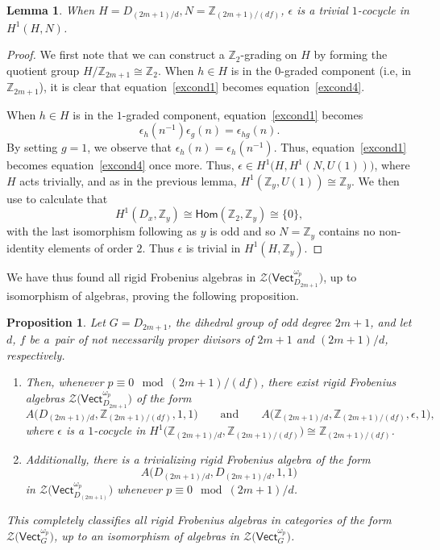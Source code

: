 \documentclass[10pt,a4paper]{amsart}
\numberwithin{equation}{section}
\newtheorem{Lemma}[Theorem]{Lemma}
\newtheorem{Proposition}[Theorem]{Proposition}
 { \theoremstyle{definition}
\newtheorem{Definition}[Theorem]{Definition}
\newtheorem{Note}[Theorem]{Note}
\newtheorem{Notation}[Theorem]{Notation}
\newtheorem{Example}[Theorem]{Example}
\newtheorem{Remark}[Theorem]{Remark} }
\newcommand{\Hom}{\mathsf{Hom}}
\newcommand{\Vect}{\mathsf{Vect}}
\newcommand{\mZ}{\mathbb{Z}}
\newcommand{\cZ}{\mathcal{Z}}
\begin{document}
\begin{Lemma}
 When $H=D_{(2m+1)/d},N=\mZ_{(2m+1)/(df)}$, $\epsilon$ is a trivial $1$-cocycle in $H^1(H,N)$.
\end{Lemma}
\begin{proof}
We first note that we can construct a $\mZ_2$-grading on $H$ by forming the quotient group $H/\mZ_{2m+1}\cong \mZ_2$. When $h\in H$ is in the $0$-graded component (i.e, in $\mZ_{2m+1}$), it is clear that equation~\eqref{excond1} becomes equation~\eqref{excond4}.

When $h \in H$ is in the $1$-graded component, equation~\eqref{excond1} becomes \[\epsilon_h(n^{-1})\epsilon_g(n) = \epsilon_{hg}(n).\]
By setting $g=1$, we observe that $\epsilon_h(n)=\epsilon_h(n^{-1})$. Thus, equation~\eqref{excond1} becomes equation~\eqref{excond4} once more. Thus, $\epsilon \in H^1\big(H,H^1(N,U(1))\big)$, where $H$ acts trivially, and as in the previous lemma, $H^1(\mZ_y,U(1)) \cong \mZ_y$. We then use \cite[Theorem~3.6.5, Corollary~3.3.11, Example~6.8.5]{Wei} to calculate that
\[H^1(D_x,\mZ_y)\cong \Hom(\mZ_2,\mZ_y) \cong \lbrace 0 \rbrace,\]
with the last isomorphism following as $y$ is odd and so $N=\mZ_y$ contains no non-identity elements of order $2$. Thus $\epsilon$ is trivial in $H^1(H,\mZ_y)$.
\end{proof}

We have thus found all rigid Frobenius algebras in $\cZ\big(\Vect_{D_{2m+1}}^{\omega_p}\big)$, up to isomorphism of algebras, proving the following proposition.

\begin{Proposition}
 Let $G=D_{2m+1}$, the dihedral group of odd degree $2m+1$, and let $d$, $f$ be a~pair of not necessarily proper divisors of $2m+1$ and $(2m+1)/d$, respectively.
 \begin{enumerate}\itemsep=0pt
 \item[$(a)$]
 Then, whenever $p\equiv 0 \mod (2m+1)/(df)$, there exist rigid Frobenius algebras $\cZ\big(\Vect_{D_{2m+1}}^{\omega_p}\big)$ of the form
 \[A\big(D_{(2m+1)/d},\mZ_{(2m+1)/(df)},1,1\big)\qquad \text{and}\qquad
A\big(\mZ_{(2m+1)/d},\mZ_{(2m+1)/(df)},\epsilon,1\big),\]
 where $\epsilon$ is a $1$-cocycle in $ H^1\big(\mZ_{(2m+1)/d}, \mZ_{(2m+1)/(df)}\big)\cong \mZ_{(2m+1)/(df)}$.
 \item[$(b)$] Additionally, there is a trivializing rigid Frobenius algebra of the form
 \[A\big(D_{(2m+1)/d},D_{(2m+1)/d},1,1\big)\]
 in $\cZ\big(\Vect_{D_{(2m+1)}}^{\omega_p}\big)$ whenever $p\equiv 0 \mod (2m+1)/d$.
 \end{enumerate}
This completely classifies all rigid Frobenius algebras in categories of the form $\cZ\big(\Vect_G^{\omega_p}\big)$, up to an isomorphism of algebras in $\cZ\big(\Vect_G^{\omega_p}\big)$.
\end{Proposition}
\end{document}
